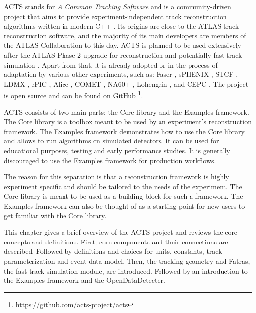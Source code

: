 ACTS stands for \textit{A Common Tracking Software} and is a community-driven project that aims to provide experiment-independent track reconstruction algorithms written in modern C++ \cite{acts-2022}. Its origins are close to the ATLAS track reconstruction software, and the majority of its main developers are members of the ATLAS Collaboration to this day. ACTS is planned to be used extensively after the ATLAS Phase-2 upgrade for reconstruction and potentially fast track simulation \cite{atlas-tdr-029-add}. Apart from that, it is already adopted or in the process of adaptation by various other experiments, such as: Faser \cite{faser}\cite{faser2}, sPHENIX \cite{sphenix}, STCF \cite{stcf}, LDMX \cite{ldmx}, ePIC \cite{epic}, Alice \cite{alice}, COMET \cite{comet2}, NA60+ \cite{na60+}, Lohengrin \cite{lohengrin}, and CEPC \cite{cepc}. The project is open source and can be found on GitHub \footnote{\url{https://github.com/acts-project/acts}}.


ACTS consists of two main parts: the Core library and the Examples framework. The Core library is a toolbox meant to be used by an experiment's reconstruction framework. The Examples framework demonstrates how to use the Core library and allows to run algorithms on simulated detectors. It can be used for educational purposes, testing and early performance studies. It is generally discouraged to use the Examples framework for production workflows.

The reason for this separation is that a reconstruction framework is highly experiment specific and should be tailored to the needs of the experiment. The Core library is meant to be used as a building block for such a framework. The Examples framework can also be thought of as a starting point for new users to get familiar with the Core library.

This chapter gives a brief overview of the ACTS project and reviews the core concepts and definitions. First, core components and their connections are described. Followed by definitions and choices for units, constants, track parameterization and event data model. Then, the tracking geometry and Fatras, the fast track simulation module, are introduced. Followed by an introduction to the Examples framework and the OpenDataDetector.

